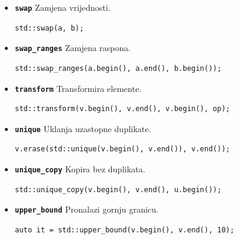\begin{itemize}
\item \textbf{\texttt{swap}}\newline
Zamjena vrijednosti.
\begin{verbatim}
std::swap(a, b);
\end{verbatim}

\item \textbf{\texttt{swap\_ranges}}\newline
Zamjena raspona.
\begin{verbatim}
std::swap_ranges(a.begin(), a.end(), b.begin());
\end{verbatim}

\item \textbf{\texttt{transform}}\newline
Transformira elemente.
\begin{verbatim}
std::transform(v.begin(), v.end(), v.begin(), op);
\end{verbatim}

\item \textbf{\texttt{unique}}\newline
Uklanja uzastopne duplikate.
\begin{verbatim}
v.erase(std::unique(v.begin(), v.end()), v.end());
\end{verbatim}

\item \textbf{\texttt{unique\_copy}}\newline
Kopira bez duplikata.
\begin{verbatim}
std::unique_copy(v.begin(), v.end(), u.begin());
\end{verbatim}

\item \textbf{\texttt{upper\_bound}}\newline
Pronalazi gornju granicu.
\begin{verbatim}
auto it = std::upper_bound(v.begin(), v.end(), 10);
\end{verbatim}
\end{itemize}